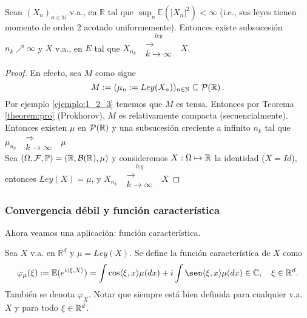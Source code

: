 \begin{example}
Sean $(X_n)_{n\in\mathbb{N}}$ v.a., en $\mathbb{R}$ tal que $\displaystyle\sup_n\mathbb{E}(|X_n|^2)<\infty$ (i.e., sus leyes tienen momento de orden 2 acotado uniformemente). Entonces existe subsucesión $n_k\nearrow\infty$ y $X$ v.a., en $E$ tal que $X_{n_k}\mbox{ }\overset{ley}{\substack{\longrightarrow \\k \to \infty}}\mbox{ }X$.
\end{example}
\begin{proof}
\gris En efecto, sea $M$ como sigue
$$ M:=(\mu_n:=Ley(X_n))_{n\in\mathbb{N}}\subseteq\mathcal{P}(\mathbb{R}) \, .$$
Por ejemplo \ref{ejemplo:1_2_3} tenemos que $M$ es tensa. Entonces por Teorema \ref{theorem:pro} (Prokhorov), $M$ es relativamente compacta (secuencialmente). Entonces existen $\mu$ en $\mathcal{P}(\mathbb{R})$ y una subsucesión creciente a infinito $n_k$ tal que $\mu_{n_k}\mbox{ }\substack{\Longrightarrow \\k \to \infty}\mbox{ } \mu$ 
\\ Sea $(\Omega,\mathcal{F},\mathbb{P}) = (\mathbb{R},\mathcal{B}(\mathbb{R}),\mu)$ y consideremos $X:\Omega\mapsto\mathbb{R}$ la identidad ($X=Id$), \\ entonces $Ley(X)=\mu$, y $X_{n_k}\mbox{ }\overset{ley}{\substack{\longrightarrow \\k \to \infty}}\mbox{ } X$
\findem
\negro
\end{proof}

\subsubsection{Convergencia débil y función característica}
Ahora veamos una aplicación: función característica.

\begin{definition}
Sea $X$ v.a. en $\mathbb{R}^d$ y $\mu=Ley(X)$. Se define la función característica de $X$ como
\begin{alignat*}{2}
    \varphi_\mu(\xi) := \mathbb{E}(e^{i\langle\xi,X\rangle}) =\int \cos\langle\xi,x\rangle\mu(dx) +i\int \sen\langle \xi,x\rangle\mu(dx)\in\mathbb{C},\quad \xi\in\mathbb{R}^d.
\end{alignat*}
También se denota $\varphi_X$. Notar que siempre está bien definida para cualquier v.a. $X$ y para todo $\xi\in\mathbb{R}^d$.
\end{definition} 

